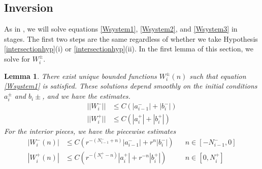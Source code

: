\documentclass[12pt]{article}
\newtheorem{lemma}{Lemma}
\begin{document}
\subsection{Inversion}

As in \cite{Sandstede1997}, we will solve equations \eqref{Wsystem1}, \eqref{Wsystem2}, and \eqref{Wsystem3} in stages. The first two steps are the same regardless of whether we take Hypothesis \ref{intersectionhyp}(i) or \ref{intersectionhyp}(ii). In the first lemma of this section, we solve for $W_i^\pm$. 

\begin{lemma}\label{inv1}
There exist unique bounded functions $W_i^\pm(n)$ such that equation \eqref{Wsystem1} is satisfied. These solutions depend smoothly on the initial conditions $a_i^\pm$ and $b_i\pm$, and we have the estimates.
\begin{equation}\label{Wipmest}
\begin{aligned}
||W_i^-|| &\leq C (|a_{i-1}^-| + |b_i^-|) \\
||W_i^+|| &\leq C (|a_i^+| + |b_i^+| )
\end{aligned}
\end{equation}
For the interior pieces, we have the piecewise estimates
\begin{equation}\label{Wipiecewise}
\begin{aligned}
|W_i^-(n)| &\leq C (r^{-(N_{i-1}^- + n)}|a_{i-1}^-| + r^n|b_i^-|) && n \in [-N_{i-1}^-, 0] \\
|W_i^+(n)| &\leq C (r^{-(N_i^+ - n)}|a_i^+| + r^{-n}|b_i^+| ) && n \in [0, N_i^+] 
\end{aligned}
\end{equation}


\end{lemma}
\end{document}
